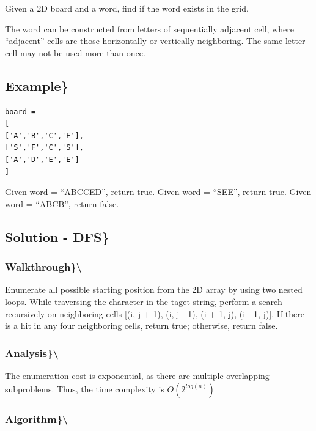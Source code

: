 \documentclass[]{book}
\begin{document}
Given a 2D board and a word, find if the word exists in the grid.

The word can be constructed from letters of sequentially adjacent cell, where ``adjacent'' cells are those
horizontally or vertically neighboring. The same letter cell may not be used more than once.

\hypertarget{example-45}{%
\subsection{Example\}}\label{example-45}}

\begin{verbatim}
board =
[
['A','B','C','E'],
['S','F','C','S'],
['A','D','E','E']
]
\end{verbatim}

Given word = ``ABCCED'', return true.
Given word = ``SEE'', return true.
Given word = ``ABCB'', return false.

\hypertarget{solution---dfs}{%
\subsection{Solution - DFS\}}\label{solution---dfs}}

\hypertarget{walkthrough-48}{%
\subsubsection{Walkthrough\}\textbackslash{}}\label{walkthrough-48}}

Enumerate all possible starting position from the 2D array by using two nested loops. While traversing the character
in the taget string, perform a search recursively on neighboring cells {[}(i, j + 1), (i, j - 1), (i + 1, j), (i - 1, j){]}.
If there is a hit in any four neighboring cells, return true; otherwise, return false.

\hypertarget{analysis-53}{%
\subsubsection{Analysis\}\textbackslash{}}\label{analysis-53}}

The enumeration cost is exponential, as there are multiple overlapping subproblems. Thus, the time complexity is
\(O(2^{log(n)})\)

\hypertarget{algorithm-53}{%
\subsubsection{Algorithm\}\textbackslash{}}\label{algorithm-53}}
\end{document}

